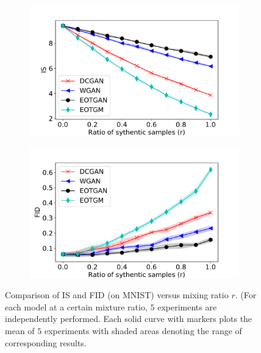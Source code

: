 \begin{figure}[!t]
  \centering
  \begin{subfigure}[b]{0.44\textwidth}
    \centering
    \includegraphics[width=1.1\linewidth]{images/mnist/tra_score/IS_29.pdf}\vspace{-3pt}
    \caption{}
    \label{fig-tra-is}
  \end{subfigure}
  \begin{subfigure}[b]{0.44\textwidth}
    \centering
    \includegraphics[width=1.1\linewidth]{images/mnist/tra_score/FID_29.pdf}\vspace{-3pt}
    \caption{}
    \label{fig-tra-fid}
  \end{subfigure}
  \caption{Comparison of IS and FID (on MNIST) versus mixing ratio $r$. (For each model at a certain mixture ratio, $5$ experiments are independently performed. Each solid curve with markers plots the mean of $5$ experiments with shaded areas denoting the range of corresponding results.}
  \label{fig-tra-score}
  \vspace{0.4cm}
\end{figure}


